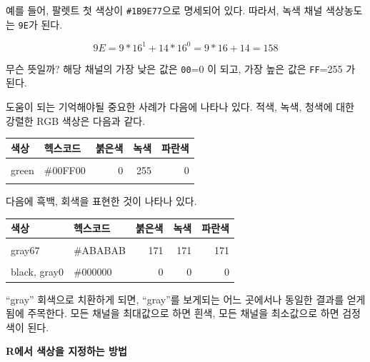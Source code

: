 \documentclass[
  letterpaper,
]{book}
\begin{document}
예를 들어, 팔렛트 첫 색상이 \texttt{\#1B9E77}으로 명세되어 있다. 따라서,
녹색 채널 색상농도는 \texttt{9E}가 된다.

\[ 9E = 9 * 16^1 + 14 * 16^0 = 9 * 16 + 14 = 158 \]

무슨 뜻일까? 해당 채널의 가장 낮은 값은 \texttt{00}=0 이 되고, 가장 높은
값은 \texttt{FF}=255 가 된다.

도움이 되는 기억해야될 중요한 사례가 다음에 나타나 있다. 적색, 녹색,
청색에 대한 강렬한 RGB 색상은 다음과 같다.

\begin{table}[!h]
\centering
\begin{tabular}[t]{l|l|r|r|r}
\hline
색상 & 헥스코드 & 붉은색 & 녹색 & 파란색\\
\hline
\cellcolor{gray!6}{blue} & \cellcolor{gray!6}{\#0000FF} & \cellcolor{gray!6}{0} & \cellcolor{gray!6}{0} & \cellcolor{gray!6}{255}\\
\hline
green & \#00FF00 & 0 & 255 & 0\\
\hline
\cellcolor{gray!6}{red} & \cellcolor{gray!6}{\#FF0000} & \cellcolor{gray!6}{255} & \cellcolor{gray!6}{0} & \cellcolor{gray!6}{0}\\
\hline
\end{tabular}
\end{table}

다음에 흑백, 회색을 표현한 것이 나타나 있다.

\begin{table}[!h]
\centering
\begin{tabular}[t]{l|l|r|r|r}
\hline
색상 & 헥스코드 & 붉은색 & 녹색 & 파란색\\
\hline
\cellcolor{gray!6}{white, gray100} & \cellcolor{gray!6}{\#FFFFFF} & \cellcolor{gray!6}{255} & \cellcolor{gray!6}{255} & \cellcolor{gray!6}{255}\\
\hline
gray67 & \#ABABAB & 171 & 171 & 171\\
\hline
\cellcolor{gray!6}{gray33} & \cellcolor{gray!6}{\#545454} & \cellcolor{gray!6}{84} & \cellcolor{gray!6}{84} & \cellcolor{gray!6}{84}\\
\hline
black, gray0 & \#000000 & 0 & 0 & 0\\
\hline
\end{tabular}
\end{table}

``gray'' 회색으로 치환하게 되면, ``gray''를 보게되는 어느 곳에서나
동일한 결과를 얻게 됨에 주목한다. 모든 채널을 최대값으로 하면 흰색, 모든
채널을 최소값으로 하면 검정색이 된다.

\textbf{R에서 색상을 지정하는 방법}
\end{document}
